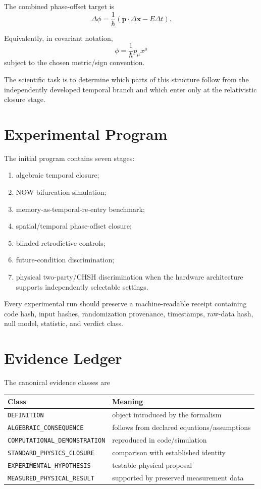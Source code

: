 \documentclass[11pt,a4paper]{book}
\begin{document}
The combined phase-offset target is
\begin{equation}
\boxed{
\Delta\phi=
\frac{1}{\hbar}
\left(
\mathbf p\cdot\Delta\mathbf x-E\Delta t
\right)
}.
\end{equation}

Equivalently, in covariant notation,
\begin{equation}
\phi=\frac{1}{\hbar}p_\mu x^\mu
\end{equation}
subject to the chosen metric/sign convention.

The scientific task is to determine which parts of this structure follow from the independently developed temporal branch and which enter only at the relativistic closure stage.

\chapter{Experimental Program}
The initial program contains seven stages:
\begin{enumerate}[label=E\arabic*.]
\item algebraic temporal closure;
\item NOW bifurcation simulation;
\item memory-as-temporal-re-entry benchmark;
\item spatial/temporal phase-offset closure;
\item blinded retrodictive controls;
\item future-condition discrimination;
\item physical two-party/CHSH discrimination when the hardware architecture supports independently selectable settings.
\end{enumerate}

Every experimental run should preserve a machine-readable receipt containing code hash, input hashes, randomization provenance, timestamps, raw-data hash, null model, statistic, and verdict class.

\chapter{Evidence Ledger}
The canonical evidence classes are
\begin{center}
\begin{tabular}{ll}
\toprule
Class & Meaning \\
\midrule
\texttt{DEFINITION} & object introduced by the formalism \\
\texttt{ALGEBRAIC\_CONSEQUENCE} & follows from declared equations/assumptions \\
\texttt{COMPUTATIONAL\_DEMONSTRATION} & reproduced in code/simulation \\
\texttt{STANDARD\_PHYSICS\_CLOSURE} & comparison with established identity \\
\texttt{EXPERIMENTAL\_HYPOTHESIS} & testable physical proposal \\
\texttt{MEASURED\_PHYSICAL\_RESULT} & supported by preserved measurement data \\
\bottomrule
\end{tabular}
\end{center}
\end{document}
